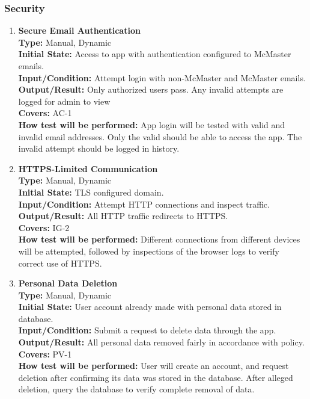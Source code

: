 \documentclass[12pt, titlepage]{article}
\begin{document}
\subsubsection{Security}
\begin{enumerate}[label=\bfseries ST-\arabic*:, wide=0pt]

  \item \label{test-ST1} \textbf{Secure Email Authentication}\\[2mm]
    {\bf Type:} Manual, Dynamic\\
    {\bf Initial State:} Access to app with authentication configured to McMaster emails.\\
    {\bf Input/Condition:} Attempt login with non-McMaster and McMaster emails.\\
    {\bf Output/Result:} Only authorized users pass. Any invalid attempts are logged for admin to view\\
    {\bf Covers:} AC-1\\
    {\bf How test will be performed:} App login will be tested with valid and invalid email addresses. Only the valid should be able to access the app. The invalid attempt should be logged in history.\\

  \item \label{test-ST2} \textbf{HTTPS-Limited Communication}\\[2mm]
    {\bf Type:} Manual, Dynamic\\
    {\bf Initial State:} TLS configured domain.\\
    {\bf Input/Condition:} Attempt HTTP connections and inspect traffic.\\
    {\bf Output/Result:} All HTTP traffic redirects to HTTPS.\\
    {\bf Covers:} IG-2\\
    {\bf How test will be performed:} Different connections from different devices will be attempted, followed by inspections of the browser logs to verify correct use of HTTPS.\\

  \item \label{test-ST3} \textbf{Personal Data Deletion}\\[2mm]
    {\bf Type:} Manual, Dynamic\\
    {\bf Initial State:} User account already made with personal data stored in database.\\
    {\bf Input/Condition:} Submit a request to delete data through the app.\\
    {\bf Output/Result:} All personal data removed fairly in accordance with policy.\\
    {\bf Covers:} PV-1\\
    {\bf How test will be performed:} User will create an account, and request deletion after confirming its data was stored in the database. After alleged deletion, query the database to verify complete removal of data.\\


\end{enumerate}
\end{document}
